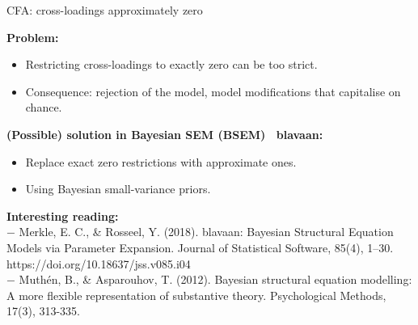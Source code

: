 \documentclass[10pt]{beamer}\usepackage[]{graphicx}\usepackage[]{xcolor}
\begin{document}
\begin{frame}[fragile]{CFA: cross-loadings approximately zero}

\textbf{Problem:}
    \begin{itemize}
        \item Restricting cross-loadings to exactly zero can be too strict.
        \item Consequence: rejection of the model, model modifications that capitalise on chance.
    \end{itemize}

\textbf{(Possible) solution in Bayesian SEM (BSEM) \ blavaan:}
    \begin{itemize}
        \item Replace exact zero restrictions with approximate ones.
        \item Using Bayesian small-variance priors.
    \end{itemize}
\vspace{5mm}
\textbf{Interesting reading:}\\
$-$ Merkle, E. C., \& Rosseel, Y. (2018). blavaan: Bayesian Structural Equation Models via Parameter Expansion. Journal of Statistical Software, 85(4), 1–30. https://doi.org/10.18637/jss.v085.i04
\\
$-$ Muthén, B., \& Asparouhov, T. (2012). Bayesian structural equation modelling: A more flexible representation of substantive theory. Psychological Methods, 17(3), 313-335.
\end{frame}
%
%
\end{document}
